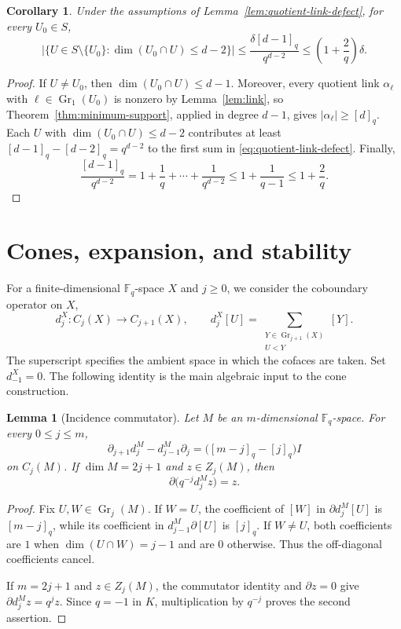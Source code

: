 \documentclass[11pt]{article}
\numberwithin{equation}{section}
\newtheorem{lemma}[theorem]{Lemma}
\newtheorem{corollary}[theorem]{Corollary}
\newcommand{\F}{\mathbb F}
\newcommand{\Gr}{\operatorname{Gr}}
\begin{document}
\begin{corollary}\label{cor:quotient-link-defect}
Under the assumptions of Lemma~\ref{lem:quotient-link-defect}, for
every $U_0\in S$,
\[
 \bigl|\{U\in S\setminus\{U_0\}:
 \dim(U_0\cap U)\le d-2\}\bigr|
 \le \frac{\delta[d-1]_q}{q^{d-2}}
 \le\left(1+\frac2q\right)\delta.
\]
\end{corollary}

\begin{proof}
If $U\ne U_0$, then $\dim(U_0\cap U)\le d-1$. Moreover, every quotient
link $\alpha_\ell$ with $\ell\in\Gr_1(U_0)$ is nonzero by
Lemma~\ref{lem:link}, so Theorem~\ref{thm:minimum-support}, applied in
degree $d-1$, gives $|\alpha_\ell|\ge[d]_q$. Each $U$ with
$\dim(U_0\cap U)\le d-2$ contributes at least
$[d-1]_q-[d-2]_q=q^{d-2}$ to the first sum in
\eqref{eq:quotient-link-defect}. 
Finally,
\[
\frac{[d-1]_q}{q^{d-2}}
=1+\frac1q+\cdots+\frac1{q^{d-2}}
\le1+\frac1{q-1}
\le1+\frac2q.
\]
\end{proof}

\section{Cones, expansion, and stability}
\label{sec:cones-and-expansion}

For a finite-dimensional $\F_q$-space $X$ and $j\ge0$, we consider the coboundary operator on $X$,
\[
 d_j^X:C_j(X)\longrightarrow C_{j+1}(X),
 \qquad
 d_j^X[U]
 =
 \sum_{\substack{Y\in\Gr_{j+1}(X)\\U<Y}}[Y].
\]
The superscript specifies the ambient space in which the cofaces are
taken. Set $d_{-1}^X=0$.
The following identity is the main algebraic input to the
cone construction.

\begin{lemma}[Incidence commutator]
\label{lem:incidence-commutator}
Let $M$ be an $m$-dimensional $\F_q$-space. For every
$0\le j\le m$,
\[
 \partial_{j+1}d_j^M-d_{j-1}^M\partial_j
 =
 \bigl([m-j]_q-[j]_q\bigr)I
\]
on $C_j(M)$. If $\dim M=2j+1$ and $z\in Z_j(M)$, then
\[
 \partial\bigl(q^{-j}d_j^Mz\bigr)=z.
\]
\end{lemma}

\begin{proof}
Fix $U,W\in\Gr_j(M)$. If $W=U$, the coefficient of $[W]$ in
$\partial d_j^M[U]$ is $[m-j]_q$, while its coefficient in
$d_{j-1}^M\partial[U]$ is $[j]_q$. If $W\ne U$, both coefficients
are $1$ when $\dim(U\cap W)=j-1$ and are $0$ otherwise. Thus the
off-diagonal coefficients cancel.

If $m=2j+1$ and $z\in Z_j(M)$, the commutator identity and
$\partial z=0$ give $\partial d_j^Mz=q^jz$. Since $q=-1$ in $K$,
multiplication by $q^{-j}$ proves the second assertion.
\end{proof}
\end{document}
